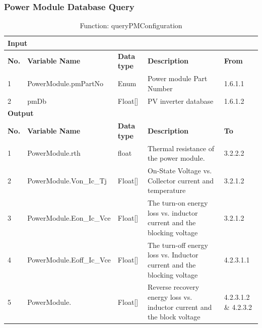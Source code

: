 \documentclass{article}
\begin{document}
\subsubsection{Power Module Database Query}
\begin{table}[h]
\centering
\caption{Function: queryPMConfiguration}
\begin{tabular}{|l|p{3.5cm}|l|p{6cm}|p{1.5cm}|}
\hline
\multicolumn{5}{|l|}{\textbf{Input}} \\ \hline
\textbf{No.} & \textbf{Variable Name} & \textbf{Data type} & \textbf{Description} & \textbf{From} \\ \hline
1 & PowerModule.pmPartNo & Enum & Power module Part Number & 1.6.1.1 \\ \hline
2 & pmDb & Float[] & PV inverter database & 1.6.1.2 \\ \hline
\multicolumn{5}{|l|}{\textbf{Output}} \\ \hline
\textbf{No.} & \textbf{Variable Name} & \textbf{Data type} & \textbf{Description} & \textbf{To} \\ \hline
1 & PowerModule.rth & float & Thermal resistance of the power module. & 3.2.2.2 \\ \hline
2 & PowerModule.Von\_Ic\_Tj & Float[] & On-State Voltage vs. Collector current and temperature & 3.2.1.2 \\ \hline
3 & PowerModule.Eon\_Ic\_Vce & Float[] & The turn-on energy loss vs. inductor current and the blocking voltage & 3.2.1.2 \\ \hline
4 & PowerModule.Eoff\_Ic\_Vce & Float[] & The turn-off energy loss vs. Inductor current and the blocking voltage & 4.2.3.1.1 \\ \hline
5 & PowerModule. & Float[] & Reverse recovery energy loss vs. inductor current and the block voltage & 4.2.3.1.2 \& 4.2.3.2 \\ \hline
\end{tabular}
\end{table}
\end{document}
